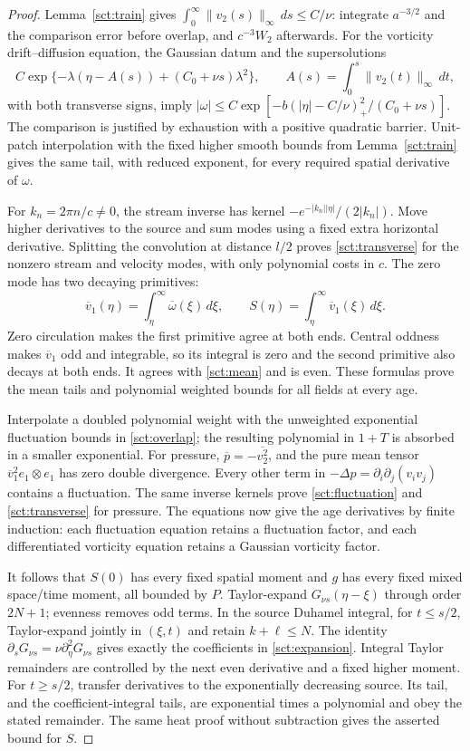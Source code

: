 \begin{proof}
Lemma~\ref{sct:train} gives
$\int_0^\infty\|v_2(s)\|_\infty\,ds\leq C/\nu$:
integrate $a^{-3/2}$ and the comparison error before overlap, and
$c^{-3}W_2$ afterwards. For the vorticity drift--diffusion equation,
the Gaussian datum and the supersolutions
\[
 C\exp\{-\lambda(\eta-A(s))+(C_0+\nu s)\lambda^2\},\qquad
 A(s)=\int_0^s\|v_2(t)\|_\infty\,dt,
\]
with both transverse signs, imply
$|\omega|\leq C\exp[-b(|\eta|-C/\nu)_+^2/(C_0+\nu s)]$.
The comparison is justified by exhaustion with a positive quadratic
barrier. Unit-patch interpolation with the fixed higher smooth bounds
from Lemma~\ref{sct:train} gives the same tail, with reduced exponent,
for every required spatial derivative of $\omega$.

For $k_n=2\pi n/c\ne0$, the stream inverse has kernel
$-e^{-|k_n||\eta|}/(2|k_n|)$. Move higher derivatives to the source
and sum modes using a fixed extra horizontal derivative. Splitting the
convolution at distance $l/2$ proves \eqref{sct:transverse} for the
nonzero stream and velocity modes, with only polynomial costs in $c$.
The zero mode has two decaying primitives:
\[
 \overline v_1(\eta)=\int_\eta^\infty\overline\omega(\xi)\,d\xi,
 \qquad S(\eta)=\int_\eta^\infty\overline v_1(\xi)\,d\xi.
\]
Zero circulation makes the first primitive agree at both ends.
Central oddness makes $\overline v_1$ odd and integrable, so its
integral is zero and the second primitive also decays at both ends.
It agrees with \eqref{sct:mean} and is even. These formulas prove the
mean tails and polynomial weighted bounds for all fields at every age.

Interpolate a doubled polynomial weight with the unweighted exponential
fluctuation bounds in \eqref{sct:overlap}; the resulting polynomial in
$1+T$ is absorbed in a smaller exponential. For pressure,
$\overline p=-\overline{v_2^2}$, and the pure mean tensor
$\overline v_1^2e_1\otimes e_1$ has zero double divergence.
Every other term in $-\Delta p=\partial_i\partial_j(v_iv_j)$
contains a fluctuation. The same inverse kernels prove
\eqref{sct:fluctuation} and \eqref{sct:transverse} for pressure.
The equations now give the age derivatives by finite induction:
each fluctuation equation retains a fluctuation factor, and each
differentiated vorticity equation retains a Gaussian vorticity factor.

It follows that $S(0)$ has every fixed spatial moment and $g$ has
every fixed mixed space/time moment, all bounded by $P$. Taylor-expand
$G_{\nu s}(\eta-\xi)$ through order $2N+1$; evenness removes odd
terms. In the source Duhamel integral, for $t\leq s/2$, Taylor-expand
jointly in $(\xi,t)$ and retain $k+\ell\leq N$. The identity
$\partial_sG_{\nu s}=\nu\partial_\eta^2G_{\nu s}$ gives exactly
the coefficients in \eqref{sct:expansion}. Integral Taylor remainders
are controlled by the next even derivative and a fixed higher moment.
For $t\geq s/2$, transfer derivatives to the exponentially decreasing
source. Its tail, and the coefficient-integral tails, are exponential
times a polynomial and obey the stated remainder. The same heat proof
without subtraction gives the asserted bound for $S$.


\end{proof}
